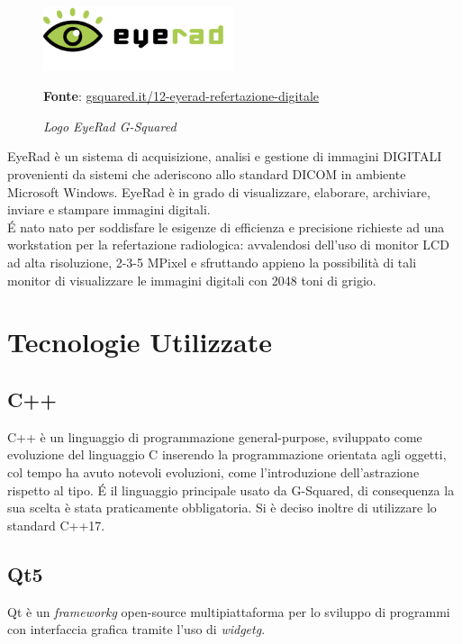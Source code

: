 \begin{figure}[h]
    \centering
    \includegraphics[width=0.5\textwidth]{immagini/logo-software-eyerad.png}
    \caption{\textit{Logo EyeRad G-Squared}}
    \textbf{Fonte}: \href{https://www.gsquared.it/it/pacs-ris-web-gateway-dicom-ihe-2/software-immagini-medicali/12-eyerad-refertazione-digitale}{gsquared.it/12-eyerad-refertazione-digitale}
    \label{fig: Logo software EyeRad G-Squared}
\end{figure}

EyeRad è un sistema di acquisizione, analisi e gestione di immagini DIGITALI provenienti da sistemi che aderiscono allo standard DICOM in ambiente Microsoft Windows.
EyeRad è in grado di visualizzare, elaborare, archiviare, inviare e stampare immagini digitali.
\\
\'E nato nato per soddisfare le esigenze di efficienza e precisione richieste ad una workstation per la refertazione radiologica: avvalendosi dell’uso di monitor LCD ad alta risoluzione, 2-3-5 MPixel e sfruttando appieno la possibilità di tali monitor di visualizzare le immagini digitali con 2048 toni di grigio.

\section{Tecnologie Utilizzate}
\subsection{C++}\label{sec:C++}
C++ è un linguaggio di programmazione general-purpose, sviluppato come evoluzione del linguaggio C inserendo la programmazione orientata agli oggetti, col tempo ha avuto notevoli evoluzioni, come l'introduzione dell'astrazione rispetto al tipo. \'E il linguaggio principale usato da G-Squared, di consequenza la sua scelta è stata praticamente obbligatoria. Si è deciso inoltre di utilizzare lo standard C++17.

\subsection{Qt5}\label{sec:Qt5}
Qt è un \textit{\gls{frameworkg}} open-source multipiattaforma per lo sviluppo di programmi con interfaccia grafica tramite l'uso di \textit{\gls{widgetg}}.

